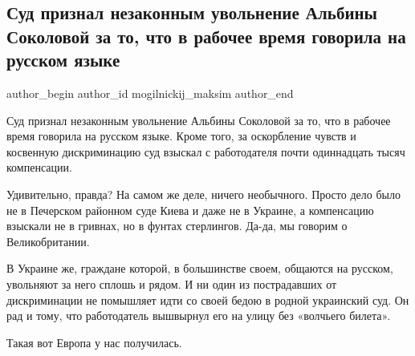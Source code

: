  
 
 
 
 
 
\subsection{Суд признал незаконным увольнение Альбины Соколовой за то, что в рабочее время говорила на русском языке}
\label{sec:27_08_2021.fb.mogilnickij_maksim.1.albina_sokolova_jazyk_britania}
 
\ifcmt
 author_begin
   author_id mogilnickij_maksim
 author_end
\fi

Суд признал незаконным увольнение Альбины Соколовой за то, что в рабочее время
говорила на русском языке. Кроме того, за оскорбление чувств и косвенную
дискриминацию суд взыскал с работодателя почти одиннадцать тысяч компенсации.

Удивительно, правда? На самом же деле, ничего необычного. Просто дело было не в
Печерском районном суде Киева и даже не в Украине, а компенсацию взыскали не в
гривнах, но в фунтах стерлингов. Да-да, мы говорим о Великобритании.

В Украине же, граждане которой, в большинстве своем, общаются на русском,
увольняют за него сплошь и рядом. И ни один из пострадавших от дискриминации не
помышляет идти со своей бедою в родной украинский суд. Он рад и тому, что
работодатель вышвырнул его на улицу без «волчьего билета».

Такая вот Европа у нас получилась.

